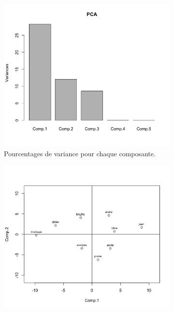 \documentclass[a4paper,11pt]{report}
\begin{document}
\begin{figure}[H]
	\centering
	\captionsetup{justification=centering, margin=2cm}
	\begin{subfigure}[b]{0.28\linewidth}
		\centering
		\captionsetup{justification=centering}
		\includegraphics[width=1\linewidth]{img/2-2-2-plot-acp}
		\caption{\scriptsize Pourcentages de variance pour chaque composante.}
		\label{fig:2-2-2-plot-acp}
	\end{subfigure}%
	\begin{subfigure}[b]{0.28\linewidth}
		\centering
		\captionsetup{justification=centering}
		\includegraphics[width=1\linewidth]{img/2-2-2-plot-acp-scores}

\end{subfigure}
\end{figure}
\end{document}

